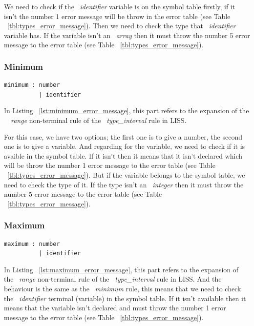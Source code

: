 \documentclass[
  oneside,
  11pt, a4paper,
  footinclude=true,
  headinclude=true,
  cleardoublepage=empty
]{scrbook}
\begin{document}
We need to check if the ~\textit{identifier} variable is on the symbol table firstly, if it isn't the number 1 error message will be throw in the error table (see Table ~\ref{tbl:types_error_message}).
Then we need to check the type that ~\textit{identifier} variable has. If the variable isn't an ~\textit{array} then it must throw the number 5 error message to the error table (see Table ~\ref{tbl:types_error_message}).

\subsubsection{Minimum}

\begin{lstlisting}[caption={Minimum rule in LISS},label={lst:minimum_error_message}]
  minimum : number
          | identifier
\end{lstlisting}

In Listing ~\ref{lst:minimum_error_message}, this part refers to the expansion of the ~~\textit{range} non-terminal rule of the ~\textit{type\_interval} rule in LISS.

For this case, we have two options; the first one is to give a number, the second one is to give a variable.
And regarding for the variable, we need to check if it is avaible in the symbol table. If it isn't then it means that it isn't declared which will be throw the number 1 error message to the error table (see Table ~\ref{tbl:types_error_message}).
But if the variable belongs to the symbol table, we need to check the type of it. If the type isn't an ~\textit{integer} then it must throw the number 5 error message to the error table (see Table ~\ref{tbl:types_error_message}).

\subsubsection{Maximum}

\begin{lstlisting}[caption={Maximum rule in LISS},label={lst:maximum_error_message}]
  maximum : number
          | identifier
\end{lstlisting}

In Listing ~\ref{lst:maximum_error_message}, this part refers to the expansion of the ~\textit{range} non-terminal rule of the ~\textit{type\_interval} rule in LISS. And the behaviour is the same as the ~\textit{minimum} rule, this means that we need to check the ~\textit{identifier} terminal (variable) in the symbol table. If it isn't available then it means that the variable isn't declared and must throw the number 1 error message to the error table (see Table ~\ref{tbl:types_error_message}).
\end{document}

